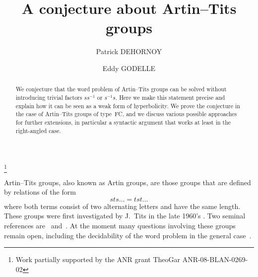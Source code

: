 \documentclass{amsart}
\numberwithin{equation}{section}
\theoremstyle{plain}
\theoremstyle{definition}
\begin{document}
\author{Patrick DEHORNOY}

\address{Laboratoire de Math\'ematiques Nicolas Oresme, UMR 6139, UCBN et CNRS, 14032 Caen, France}

\author{Eddy GODELLE}

\address{Laboratoire de Math\'ematiques Nicolas Oresme, UMR 6139, UCBN et CNRS, 14032 Caen, France}

\title{A conjecture about Artin--Tits groups}



\begin{abstract}
We conjecture that the word problem of Artin--Tits groups can be solved without introducing trivial factors ${s}{s}{^{-1}} $ or ${s}{^{-1}} {s}$. Here we make this statement precise and explain how it can be seen as a weak form of hyperbolicity. We prove the conjecture in the case of Artin--Tits groups of type~FC, and we discuss various possible approaches for further extensions, in particular a syntactic argument that works at least in the right-angled case.
\end{abstract}

\thanks{Work partially supported by the ANR grant TheoGar ANR-08-BLAN-0269-02}

\maketitle

Artin--Tits groups, also known as Artin groups, are those groups that are defined by relations of the form
\begin{equation}
\label{E:Relation}
\tag{1}
{s} {t} {s} ... = {t} {s} {t} ...
\end{equation}
where both terms consist of two alternating letters and have the same length. These groups were first investigated by J.~Tits in the late 1960's \cite{Bri}. Two seminal references are~\cite{BrS} and~\cite{Dlg}. At the moment many questions involving these groups remain open, including the decidability of the word problem in the general case~\cite{Cha}. 
\end{document}
